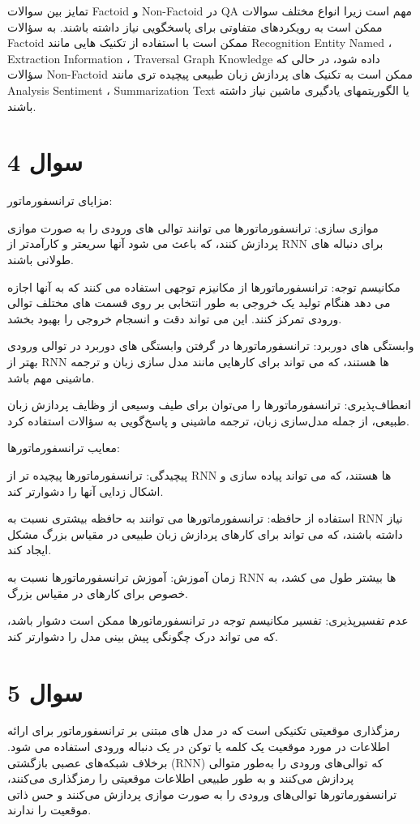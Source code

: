 \documentclass{article}
\begin{document}
تمایز بین سوالات Factoid و Non-Factoid در QA مهم است زیرا انواع مختلف سوالات ممکن است به رویکردهای متفاوتی برای پاسخگویی نیاز داشته باشند. به سؤالات Factoid ممکن است با استفاده از تکنیک هایی مانند Recognition Entity Named ، Extraction Information ، Traversal Graph Knowledge داده شود، در حالی که سؤالات Non-Factoid ممکن است به تکنیک های پردازش زبان طبیعی پیچیده تری مانند Analysis Sentiment ، Summarization Text یا الگوریتمهای یادگیری ماشین نیاز داشته باشند.

\section*{سوال 4}
مزایای ترانسفورماتور:

موازی سازی: ترانسفورماتورها می توانند توالی های ورودی را به صورت موازی پردازش کنند، که باعث می شود آنها سریعتر و کارآمدتر از RNN برای دنباله های طولانی باشند. 

مکانیسم توجه: ترانسفورماتورها از مکانیزم توجهی استفاده می کنند که به آنها اجازه می دهد هنگام تولید یک خروجی به طور انتخابی بر روی قسمت های مختلف توالی ورودی تمرکز کنند. این می تواند دقت و انسجام خروجی را بهبود بخشد. 

وابستگی های دوربرد: ترانسفورماتورها در گرفتن وابستگی های دوربرد در توالی ورودی بهتر از RNN ها هستند، که می تواند برای کارهایی مانند مدل سازی زبان و ترجمه ماشینی مهم باشد.  

انعطاف‌پذیری: ترانسفورماتورها را می‌توان برای طیف وسیعی از وظایف پردازش زبان طبیعی، از جمله مدل‌سازی زبان، ترجمه ماشینی و پاسخ‌گویی به سؤالات استفاده کرد.   


معایب ترانسفورماتورها: 

پیچیدگی: ترانسفورماتورها پیچیده تر از RNN ها هستند، که می تواند پیاده سازی و اشکال زدایی آنها را دشوارتر کند. 

استفاده از حافظه: ترانسفورماتورها می توانند به حافظه بیشتری نسبت به RNN نیاز داشته باشند، که می تواند برای کارهای پردازش زبان طبیعی در مقیاس بزرگ مشکل ایجاد کند. 

زمان آموزش: آموزش ترانسفورماتورها نسبت به RNN ها بیشتر طول می کشد، به خصوص برای کارهای در مقیاس بزرگ. 

عدم تفسیرپذیری: تفسیر مکانیسم توجه در ترانسفورماتورها ممکن است دشوار باشد، که می تواند درک چگونگی پیش بینی مدل را دشوارتر کند.

\section*{سوال 5}
رمزگذاری موقعیتی تکنیکی است که در مدل های مبتنی بر ترانسفورماتور برای ارائه اطلاعات در مورد موقعیت یک کلمه یا توکن در یک دنباله ورودی استفاده می شود. برخلاف شبکه‌های عصبی بازگشتی (RNN) که توالی‌های ورودی را به‌طور متوالی پردازش می‌کنند و به طور طبیعی اطلاعات موقعیتی را رمزگذاری می‌کنند، ترانسفورماتورها توالی‌های ورودی را به صورت موازی پردازش می‌کنند و حس ذاتی موقعیت را ندارند.
\end{document}
